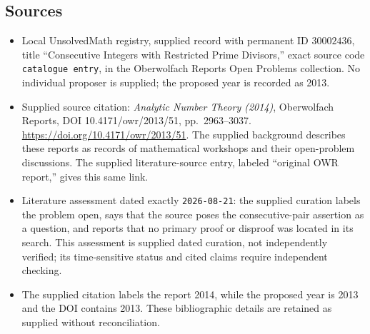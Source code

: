 \documentclass[11pt]{article}
\begin{document}
\subsection{Sources}
\begin{itemize}
\item Local UnsolvedMath registry, supplied record with permanent ID \(30002436\), title ``Consecutive Integers with Restricted Prime Divisors,'' exact source code \texttt{catalogue entry}, in the Oberwolfach Reports Open Problems collection. No individual proposer is supplied; the proposed year is recorded as 2013.
\item Supplied source citation: \emph{Analytic Number Theory (2014)}, Oberwolfach Reports, DOI 10.4171/owr/2013/51, pp.\ 2963--3037. \url{https://doi.org/10.4171/owr/2013/51}. The supplied background describes these reports as records of mathematical workshops and their open-problem discussions. The supplied literature-source entry, labeled ``original OWR report,'' gives this same link.
\item Literature assessment dated exactly \texttt{2026-08-21}: the supplied curation labels the problem open, says that the source poses the consecutive-pair assertion as a question, and reports that no primary proof or disproof was located in its search. This assessment is supplied dated curation, not independently verified; its time-sensitive status and cited claims require independent checking.
\item The supplied citation labels the report 2014, while the proposed year is 2013 and the DOI contains 2013. These bibliographic details are retained as supplied without reconciliation.
\end{itemize}
\end{document}

